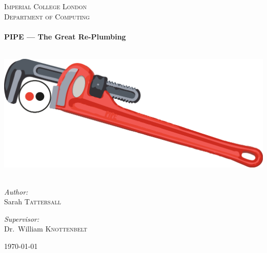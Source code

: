 \begin{titlepage}
\begin{center}



\textsc{\LARGE Imperial College London}\\[1.5cm]

\textsc{\Large Department of Computing}\\[0.5cm]

\HRule \\[0.4cm]
{ \huge \bfseries PIPE --- The Great Re-Plumbing \\[0.4cm] }

\HRule \\[1.5cm]

\includegraphics[scale=0.7]{images/pipe_wrench.png}~\\[1cm]

\begin{minipage}{0.4\textwidth}
\begin{flushleft} \large
\emph{Author:}\\
Sarah \textsc{Tattersall}
\end{flushleft}
\end{minipage}
\begin{minipage}{0.4\textwidth}
\begin{flushright} \large
\emph{Supervisor:} \\
Dr.~William \textsc{Knottenbelt}
\end{flushright}
\end{minipage}

\vfill

{\large \monthyear\today}



\end{center}
\end{titlepage}
